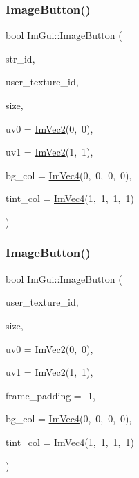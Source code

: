 \subsubsection{\texorpdfstring{Image\+Button()}{ImageButton()}\hspace{0.1cm}{\footnotesize\ttfamily [1/2]}}
{\footnotesize\ttfamily bool Im\+Gui\+::\+Image\+Button (\begin{DoxyParamCaption}\item[{const char $\ast$}]{str\+\_\+id,  }\item[{Im\+Texture\+ID}]{user\+\_\+texture\+\_\+id,  }\item[{const \hyperlink{structImVec2}{Im\+Vec2} \&}]{size,  }\item[{const \hyperlink{structImVec2}{Im\+Vec2} \&}]{uv0 = {\ttfamily \hyperlink{structImVec2}{Im\+Vec2}(0,~0)},  }\item[{const \hyperlink{structImVec2}{Im\+Vec2} \&}]{uv1 = {\ttfamily \hyperlink{structImVec2}{Im\+Vec2}(1,~1)},  }\item[{const \hyperlink{structImVec4}{Im\+Vec4} \&}]{bg\+\_\+col = {\ttfamily \hyperlink{structImVec4}{Im\+Vec4}(0,~0,~0,~0)},  }\item[{const \hyperlink{structImVec4}{Im\+Vec4} \&}]{tint\+\_\+col = {\ttfamily \hyperlink{structImVec4}{Im\+Vec4}(1,~1,~1,~1)} }\end{DoxyParamCaption})}

\mbox{\label{namespaceImGui_ac79ef64e8b9e1db73d8237f6a999da14}} 
\subsubsection{\texorpdfstring{Image\+Button()}{ImageButton()}\hspace{0.1cm}{\footnotesize\ttfamily [2/2]}}
{\footnotesize\ttfamily bool Im\+Gui\+::\+Image\+Button (\begin{DoxyParamCaption}\item[{Im\+Texture\+ID}]{user\+\_\+texture\+\_\+id,  }\item[{const \hyperlink{structImVec2}{Im\+Vec2} \&}]{size,  }\item[{const \hyperlink{structImVec2}{Im\+Vec2} \&}]{uv0 = {\ttfamily \hyperlink{structImVec2}{Im\+Vec2}(0,~0)},  }\item[{const \hyperlink{structImVec2}{Im\+Vec2} \&}]{uv1 = {\ttfamily \hyperlink{structImVec2}{Im\+Vec2}(1,~1)},  }\item[{int}]{frame\+\_\+padding = {\ttfamily -\/1},  }\item[{const \hyperlink{structImVec4}{Im\+Vec4} \&}]{bg\+\_\+col = {\ttfamily \hyperlink{structImVec4}{Im\+Vec4}(0,~0,~0,~0)},  }\item[{const \hyperlink{structImVec4}{Im\+Vec4} \&}]{tint\+\_\+col = {\ttfamily \hyperlink{structImVec4}{Im\+Vec4}(1,~1,~1,~1)} }\end{DoxyParamCaption})}

